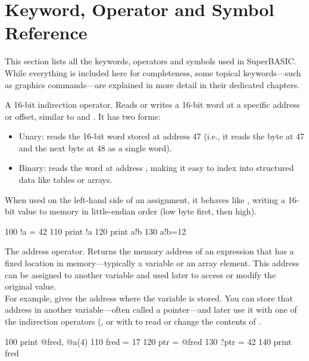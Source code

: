 \chapter{Keyword, Operator and Symbol Reference}

This section lists all the keywords, operators and symbols used in SuperBASIC. While everything is included here for completeness, some topical keywords---such as graphics commands---are explained in more detail in their dedicated chapters.

\begin{entry}
A 16-bit indirection operator. Reads or writes a 16-bit word at a specific address or offset, similar to  and . It has two forms:
\begin{itemize}
\item Unary:  reads the 16-bit word stored at address 47 (i.e., it reads the byte at 47 and the next byte at 48 as a single word).
\item Binary:  reads the word at address , making it easy to index into structured data like tables or arrays.
\end{itemize}

When used on the left-hand side of an assignment, it behaves like , writing a 16-bit value to memory in little-endian order (low byte first, then high).

\begin{lstexample}
100 !a = 42
110 print !a
120 print a!b
130 a!b=12
\end{lstexample}
\end{entry}

\begin{entry}
The address operator. Returns the memory address of an expression that has a fixed location in memory---typically a variable or an array element. This address can be assigned to another variable and used later to access or modify the original value.\\

For example,  gives the address where the variable  is stored. You can store that address in another variable---often called a pointer---and later use it with one of the indirection operators (, \code{!}{\unskip)} or with  to read or change the contents of .

\begin{lstexample}
100 print @fred, @a(4)
110 fred = 17
120 ptr = @fred
130 ?ptr = 42
140 print fred
\end{lstexample}
\end{entry}


